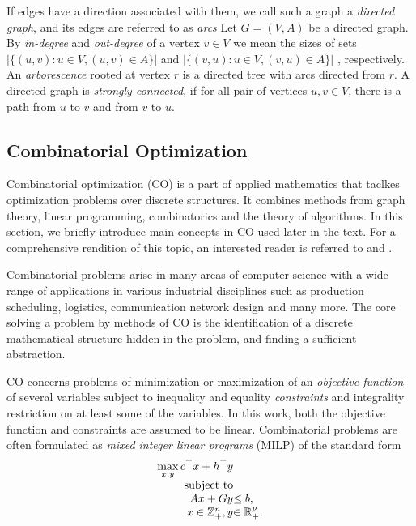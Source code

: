 If edges have a direction associated with them, we call such a graph a \emph{directed graph}, and its edges are referred to as \emph{arcs}
Let $G=(V,A)$ be a directed graph. 
By \emph{in-degree} and \emph{out-degree} of a vertex $v\in V$ we mean the sizes of sets $|\{(u,v): u\in V, (u,v) \in A\}|$ and $|\{(v,u): u\in V, (v,u) \in A\}|$ , respectively.
An \emph{arborescence} rooted at vertex $r$ is a directed tree with arcs directed from $r$.
A directed graph is \emph{strongly connected}, if for all pair of vertices $u,v\in V$, there is a path from $u$ to $v$ and from $v$ to $u$.

\subsection{Combinatorial Optimization}

Combinatorial optimization (CO) is a part of applied mathematics that taclkes optimization problems over discrete structures.
It combines methods from graph theory, linear programming, combinatorics and the theory of algorithms.
In this section, we briefly introduce main concepts in CO used later in the text.
For a comprehensive rendition of this topic, an interested reader is referred to \cite{wolsey98} and \cite{nemhauser88}.

Combinatorial problems arise in many areas of computer science with a wide range of applications in various industrial disciplines 
such as production scheduling, logistics, communication network design and many more.
The core solving a problem by methods of CO is the identification of a discrete mathematical structure hidden in the problem,
and finding a sufficient abstraction.

CO concerns problems of minimization or maximization of an \emph{objective function} of several variables 
subject to inequality and equality \emph{constraints} and integrality restriction on at least some of the variables.
In this work, both the objective function and constraints are assumed to be linear.
Combinatorial problems are often formulated as \emph{mixed integer linear programs} (MILP) of the standard form
\begin{equation}
\begin{array}{r@{}l}
	\max\limits_{x,y}c^\top x + h^\top y & \\
	\text{subject to}& \\
	  Ax + Gy &\leq b, \\
	  x \in \mathbb{Z}^{n}_+, y & \in\mathbb{R}^{p}_+. 
\end{array}
\end{equation}

